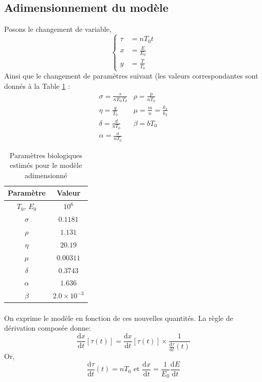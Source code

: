 \documentclass[12pt]{article}
\newcommand{\deriv}{\mathrm{d}}
\newcommand{\dt}[1]{\frac{\deriv #1}{\deriv t}}
\begin{document}
\subsection{Adimensionnement du modèle}
Posons le changement de variable, 
\begin{equation*}
    \left\{
    \begin{aligned}
        \tau &= n T_0 t\\
        x &= \frac{E}{E_0}\\
        y &= \frac{T}{T_0}
    \end{aligned}
    \right.
\end{equation*}
Ainsi que le changement de paramètres suivant (les valeurs correspondantes sont donnés à la Table \ref{table::param_bio} : 
\begin{align*}
    &\sigma = \frac{s}{n E_0 T_0}     & \rho = \frac{p}{nT_0}&\\
    &\eta = \frac{g}{T_0}  &\mu = \frac{m}{n} = \frac{k_3}{k_2}&\\
    &\delta = \frac{d}{nT_0} &\beta = bT_0&\\
    & \alpha = \frac{a}{nT_0} & &
\end{align*}
\begin{table}[h]
    \centering
    \begin{tabular}{|c|c|}
    \hline
         Paramètre & Valeur \\
    \hline
        $T_0$, $E_0$ & $10^6$ \\
        $\sigma$ & $0.1181$\\
        $\rho$ & $	1.131$\\
        $\eta$ & $ 	20.19$\\
        $\mu$ & $0.00311$\\
        $\delta$ &$0.3743$ \\
        $\alpha$ & $1.636$\\
        $\beta$ & $2.0\times 10^{-3}$\\
    \hline
    \end{tabular}
    \caption{Paramètres biologiques estimés pour le modèle adimensionné}
    \label{table::param_bio}
\end{table}

\paragraph{}On exprime le modèle en fonction de ces nouvelles quantités. La règle de dérivation composée donne: 
\[
\dt{x}\left[\tau(t)\right] = \dt{x}\left[\tau(t)\right]\times \frac{1}{\dt{\tau}(t)}
\]
Or, 
\[
    \dt{\tau}(t) = n T_0 \text{ et }
    \dt{x} = \frac{1}{E_0}\dt{E}
\]
\end{document}

